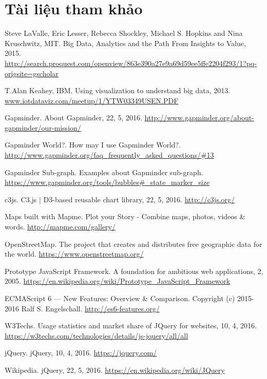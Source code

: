 \documentclass[12pt,a4paper,oneside]{article}
\begin{document}
\section{Tài liệu tham khảo}
\begin{thebibliography}{}

 Steve LaValle, Eric Lesser, Rebecca Shockley, Michael S. Hopkins and Nina Kruschwitz, MIT. Big Data, Analytics and the Path From Insights to Value, 2015. \url{http://search.proquest.com/openview/863e390a27e9a69d59ee5ffe2204f293/1?pq-origsite=gscholar}

 T.Alan Keahey, IBM. Using visualization to understand big data, 2013. \url{www.iotdataviz.com/meetup/1/YTW03349USEN.PDF}

 Gapminder. About Gapminder, 22, 5, 2016. \url{http://www.gapminder.org/about-gapminder/our-mission/}

 Gapminder World?. How may I use Gapminder World?. \url{http://www.gapminder.org/faq_frequently_asked_questions/#13}

 Gapminder Sub-graph. Examples about Gapminder sub-graph. \url{https://www.gapminder.org/tools/bubbles#_state_marker_size}


 c3js. C3.js | D3-based reusable chart library, 22, 5, 2016. \url{http://c3js.org/}

 Maps built with Mapme. Plot your Story - Combine maps, photos, videos \& words. \url{http://mapme.com/gallery/}

 OpenStreetMap. The project that creates and distributes free geographic data for the world. \url{https://www.openstreetmap.org/}

 Prototype JavaScript Framework. A foundation for ambitious web applications, 2, 2005. \url{https://en.wikipedia.org/wiki/Prototype_JavaScript_Framework}

 ECMAScript 6 — New Features: Overview \& Comparison. Copyright (c) 2015-2016 Ralf S. Engelschall. \url{http://es6-features.org/}

 W3Techs. Usage statistics and market share of JQuery for websites, 10, 4, 2016. \url{https://w3techs.com/technologies/details/js-jquery/all/all}

 jQuery. jQuery, 10, 4, 2016. \url{https://jquery.com/}

 Wikipedia. jQuery, 22, 5, 2016. \url{https://en.wikipedia.org/wiki/JQuery}


\end{thebibliography}
\end{document}
